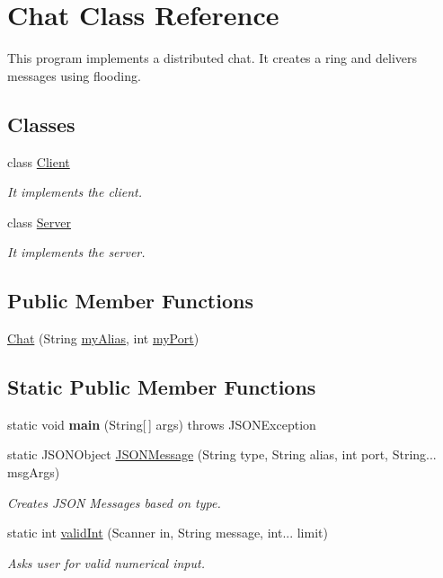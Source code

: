 \hypertarget{class_chat}{}\section{Chat Class Reference}
\label{class_chat}


This program implements a distributed chat. It creates a ring and delivers messages using flooding.  


\subsection*{Classes}
\begin{DoxyCompactItemize}
\item 
class \hyperlink{class_chat_1_1_client}{Client}
\begin{DoxyCompactList}\small\item\em It implements the client. \end{DoxyCompactList}\item 
class \hyperlink{class_chat_1_1_server}{Server}
\begin{DoxyCompactList}\small\item\em It implements the server. \end{DoxyCompactList}\end{DoxyCompactItemize}
\subsection*{Public Member Functions}
\begin{DoxyCompactItemize}
\item 
\hyperlink{class_chat_a2e9b5fbe06ab99eee05f0fc6af6dc887}{Chat} (String \hyperlink{class_chat_a35d411ee8dc3a5b258f9196b45ac4cc9}{my\+Alias}, int \hyperlink{class_chat_adf3015afad6879dd1b21a181ce21b16b}{my\+Port})
\end{DoxyCompactItemize}
\subsection*{Static Public Member Functions}
\begin{DoxyCompactItemize}
\item 
\mbox{\label{class_chat_a04e26027ad460092250efa75ce7a8a19}} 
static void {\bfseries main} (String\mbox{[}$\,$\mbox{]} args)  throws J\+S\+O\+N\+Exception 
\item 
static J\+S\+O\+N\+Object \hyperlink{class_chat_aedb8547771734d3275f8acfe106ba332}{J\+S\+O\+N\+Message} (String type, String alias, int port, String... msg\+Args)
\begin{DoxyCompactList}\small\item\em Creates J\+S\+ON Messages based on type. \end{DoxyCompactList}\item 
static int \hyperlink{class_chat_a67bee28b73b6a5dac87992427e447a83}{valid\+Int} (Scanner in, String message, int... limit)
\begin{DoxyCompactList}\small\item\em Asks user for valid numerical input. \end{DoxyCompactList}\end{DoxyCompactItemize}
